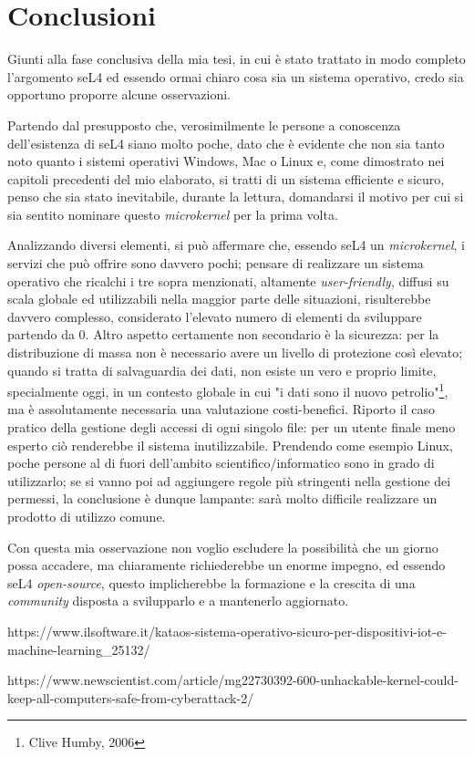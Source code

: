 \chapter{Conclusioni}
Giunti alla fase conclusiva della mia tesi, in cui è stato trattato in modo completo l'argomento seL4 ed essendo ormai chiaro cosa sia un sistema operativo, credo sia opportuno proporre alcune osservazioni.

Partendo dal presupposto che, verosimilmente le persone a conoscenza dell'esistenza di seL4 siano molto poche, dato che è evidente che non sia tanto noto quanto i sistemi operativi Windows, Mac o Linux e, come dimostrato nei capitoli precedenti del mio elaborato, si tratti di un sistema efficiente e sicuro, penso che sia stato inevitabile, durante la lettura, domandarsi il motivo per cui si sia sentito nominare questo \textit{microkernel} per la prima volta.

Analizzando diversi elementi, si può affermare che, essendo seL4 un \textit{microkernel}, i servizi che può offrire sono davvero pochi; pensare di realizzare un sistema operativo che ricalchi i tre sopra menzionati, altamente \textit{user-friendly}, diffusi su scala globale ed utilizzabili nella maggior parte delle situazioni, risulterebbe davvero complesso, considerato l'elevato numero di elementi da sviluppare partendo da 0. Altro aspetto certamente non secondario è la sicurezza: per la distribuzione di massa non è necessario avere un livello di protezione così elevato; quando si tratta di salvaguardia dei dati, non esiste un vero e proprio limite, specialmente oggi, in un contesto globale in cui "i dati sono il nuovo petrolio"\footnote{Clive Humby, 2006}, ma è assolutamente necessaria una valutazione costi-benefici. Riporto il caso pratico della gestione degli accessi di ogni singolo file: per un utente finale meno esperto ciò renderebbe il sistema inutilizzabile. Prendendo come esempio Linux, poche persone al di fuori dell'ambito scientifico/informatico sono in grado di utilizzarlo; se si vanno poi ad aggiungere regole più stringenti nella gestione dei permessi, la conclusione è dunque lampante: sarà molto difficile realizzare un prodotto di utilizzo comune.

Con questa mia osservazione non voglio escludere la possibilità che un giorno possa accadere, ma chiaramente richiederebbe un enorme impegno, ed essendo seL4 \textit{open-source}, questo implicherebbe la formazione e la crescita di una \textit{community} disposta a svilupparlo e a mantenerlo aggiornato.


https://www.ilsoftware.it/kataos-sistema-operativo-sicuro-per-dispositivi-iot-e-machine-learning_25132/

https://www.newscientist.com/article/mg22730392-600-unhackable-kernel-could-keep-all-computers-safe-from-cyberattack-2/

